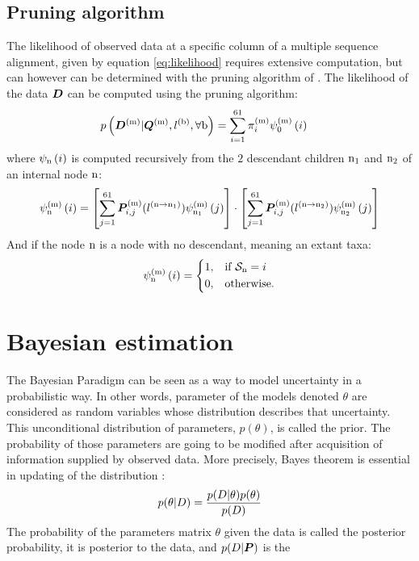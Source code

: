 \subsection{Pruning algorithm}
The \gls{likelihood} of observed data at a specific column of a multiple sequence alignment, given by equation \ref{eq:likelihood} requires extensive computation, but can however can be determined with the pruning algorithm of \citet{Felsenstein1985}. 
The \gls{likelihood} of the data $\bm{D}$ can be computed using the pruning algorithm:
\begin{align}
p\left(\bm{D}^{(\text{m})}| \bm{Q}^{(\text{m})}, l^{(\text{b})}, \forall \text{b} \right) & = \sum_{{i}=1}^{61} \pi^{(\text{m})}_{{i}} \psi^{(\text{m})}_{0} \left( {i} \right)
\end{align}
where $\psi_{\text{n}} \left( {i} \right)$ is computed recursively from the $2$ descendant children $\text{n}_{1}$ and $\text{n}_{2}$ of an internal node $\text{n}$:
\begin{align}
\psi^{(\text{m})}_{\text{n}} \left( {i} \right) = 
\left[ \sum_{{j}=1}^{61}\bm{P}^{(\text{m})}_{{i}, {j}}(l^{(\text{n} \to \text{n}_{1})}) \psi^{(\text{m})}_{\text{n}_{1}} \left( {j} \right) \right] 
\cdot 
\left[ \sum_{{j}=1}^{61}\bm{P}^{(\text{m})}_{{i}, {j}}(l^{(\text{n} \to \text{n}_{2})}) \psi^{(\text{m})}_{\text{n}_{2}} \left( {j} \right) \right] 
\end{align}
And if the node $\text{n}$ is a node with no descendant, meaning an extant taxa:
\begin{align}
\psi^{(\text{m})}_{\text{n}} \left( {i} \right) =
\begin{dcases}
1, & \text{if } \mathcal{S}_{\text{n}} = {i} \\
0, & \text{otherwise.}
\end{dcases}
\end{align}

\section{Bayesian estimation}
The Bayesian Paradigm can be seen as a way to model uncertainty in a probabilistic way.
In other words, parameter of the models denoted $\theta$ are considered as random variables whose distribution describes that uncertainty.
This unconditional distribution of parameters, $p(\theta)$, is called the \gls{prior}.
The probability of those parameters are going to be modified after acquisition of information supplied by observed data.
More precisely, Bayes theorem is essential in updating of the distribution :
\begin{equation}
	p(\theta|D)=\frac{p(D|\theta)p(\theta)}{p(D)}
\end{equation}
The probability of the parameters matrix $\theta$ given the data is called the \gls{posterior} probability, it is \gls{posterior} to the data, and $p(D|\bm{P})$ is the 

